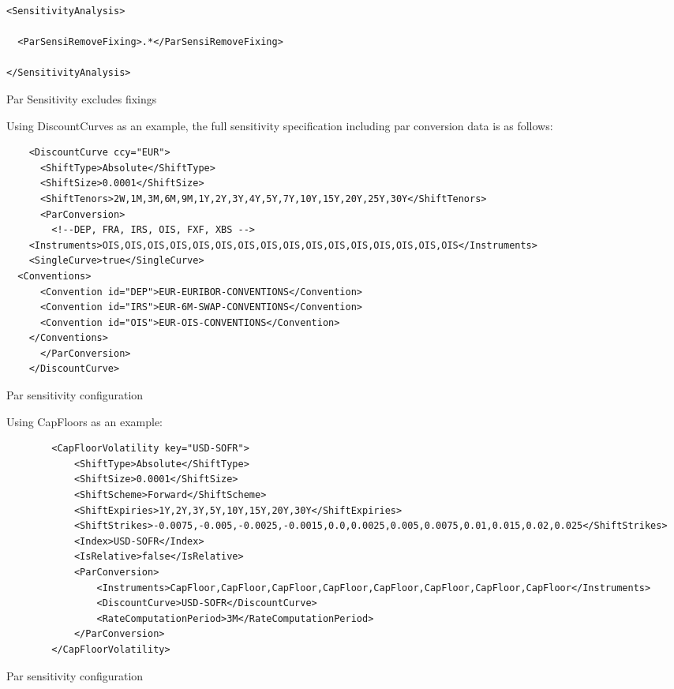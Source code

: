 \begin{longlisting}
  \begin{verbatim}
<SensitivityAnalysis>

  <ParSensiRemoveFixing>.*</ParSensiRemoveFixing>
  
</SensitivityAnalysis>
\end{verbatim}
\caption{Par Sensitivity excludes fixings}
\label{lst:par_sensi_excludes_fixings}
\end{longlisting}

Using DiscountCurves as an example, the full sensitivity specification including par conversion data is as follows:

\begin{longlisting}
  \begin{verbatim}
    <DiscountCurve ccy="EUR">
      <ShiftType>Absolute</ShiftType>
      <ShiftSize>0.0001</ShiftSize>
      <ShiftTenors>2W,1M,3M,6M,9M,1Y,2Y,3Y,4Y,5Y,7Y,10Y,15Y,20Y,25Y,30Y</ShiftTenors>
      <ParConversion>
        <!--DEP, FRA, IRS, OIS, FXF, XBS -->
	<Instruments>OIS,OIS,OIS,OIS,OIS,OIS,OIS,OIS,OIS,OIS,OIS,OIS,OIS,OIS,OIS,OIS</Instruments>
	<SingleCurve>true</SingleCurve>
  <Conventions>
	  <Convention id="DEP">EUR-EURIBOR-CONVENTIONS</Convention>
	  <Convention id="IRS">EUR-6M-SWAP-CONVENTIONS</Convention>
	  <Convention id="OIS">EUR-OIS-CONVENTIONS</Convention>
	</Conventions>
      </ParConversion>
    </DiscountCurve>   
\end{verbatim}
\caption{Par sensitivity configuration}
\label{lst:par_sensitivity_config}
\end{longlisting}

Using CapFloors as an example:

\begin{longlisting}
  \begin{verbatim}
		<CapFloorVolatility key="USD-SOFR">
			<ShiftType>Absolute</ShiftType>
			<ShiftSize>0.0001</ShiftSize>
			<ShiftScheme>Forward</ShiftScheme>
			<ShiftExpiries>1Y,2Y,3Y,5Y,10Y,15Y,20Y,30Y</ShiftExpiries>
			<ShiftStrikes>-0.0075,-0.005,-0.0025,-0.0015,0.0,0.0025,0.005,0.0075,0.01,0.015,0.02,0.025</ShiftStrikes>
			<Index>USD-SOFR</Index>
			<IsRelative>false</IsRelative>
			<ParConversion>
				<Instruments>CapFloor,CapFloor,CapFloor,CapFloor,CapFloor,CapFloor,CapFloor,CapFloor</Instruments>
				<DiscountCurve>USD-SOFR</DiscountCurve>
				<RateComputationPeriod>3M</RateComputationPeriod>
			</ParConversion>
		</CapFloorVolatility>
\end{verbatim}
\caption{Par sensitivity configuration}
\label{lst:par_sensitivity_config}
\end{longlisting}


